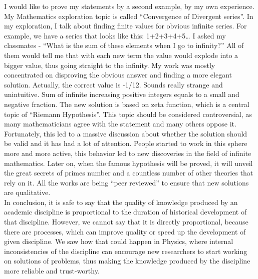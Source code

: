 \documentclass[12pt,a4paper]{article}
\begin{document}
I would like to prove my statements by a second example, by my own experience. My Mathematics exploration topic is called “Convergence of Divergent series”\cite{cods}. In my exploration, I talk about finding finite values for obvious infinite series. For example, we have a series that looks like this: 1+2+3+4+5… I asked my classmates - “What is the sum of these elements when I go to infinity?” All of them would tell me that with each new term the value would explode into a bigger value, thus going straight to the infinity. My work was mostly concentrated on disproving the obvious answer and finding a more elegant solution. Actually, the correct value is -1/12. Sounds really strange and unintuitive. Sum of infinite increasing positive integers equals to a small and negative fraction. The new solution is based on zeta function\cite{zeta}, which is a central topic of “Riemann Hypothesis”\cite{hypot}. This topic should be considered controversial, as many mathematicians agree with the statement and many others oppose it. Fortunately, this led to a massive discussion about whether the solution should be valid and it has had a lot of attention. People started to work in this sphere more and more active, this behavior led to new discoveries in the field of infinite mathematics. Later on, when the famous hypothesis will be proved, it will unveil the great secrets of primes number and a countless number of other theories that rely on it. All the works are being “peer reviewed” to ensure that new solutions are qualitative.\\

In conclusion, it is safe to say that the quality of knowledge produced by an academic discipline is proportional to the duration of historical development of that discipline. However, we cannot say that it is directly proportional, because there are processes, which can improve quality or speed up the development of given discipline. We saw how that could happen in Physics, where internal inconsistencies of the discipline can encourage new researchers to start working on solutions of problems, thus making the knowledge produced by the discipline more reliable and trust-worthy. \\

\singlespacing
\newpage


\end{document}
